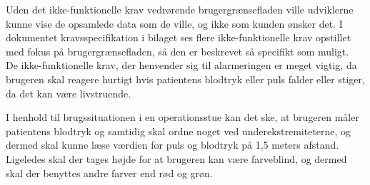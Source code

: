 Uden det ikke-funktionelle krav vedrørende brugergrænsefladen ville udviklerne kunne vise de opsamlede data som de ville, og ikke som kunden ønsker det. I dokumentet kravsspecifikation i bilaget ses flere ikke-funktionelle krav opstillet med fokus på brugergrænsefladen, så den er beskrevet så specifikt som muligt. \\


De ikke-funktionelle krav, der henvender sig til alarmeringen er meget vigtig, da brugeren skal reagere hurtigt hvis patientens blodtryk eller puls falder eller stiger, da det kan være livstruende.

I henhold til brugssituationen i en operationsstue kan det ske, at brugeren måler patientens blodtryk og samtidig skal ordne noget ved underekstremiteterne, og dermed skal kunne læse værdien for puls og blodtryk på 1,5 meters afstand. Ligeledes skal der tages højde for at brugeren kan være farveblind, og dermed skal der benyttes andre farver end rød og grøn.\\